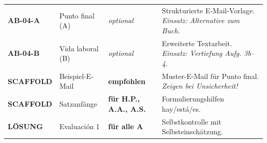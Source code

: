 \documentclass[11pt, a4paper]{article}
\begin{document}
\begin{tcolorbox}[
    colback=hellgrau,
    colframe=phase,
    title={\footnotesize\bfseries Arbeitsblätter \& Scaffolds},
    fonttitle=\bfseries,
    boxrule=0.5pt,
    top=2pt, bottom=2pt, left=4pt, right=4pt
]
\footnotesize
\begin{tabularx}{\textwidth}{@{}lp{3cm}lX@{}}
\textbf{AB-04-A} & Punto final (A) & \textit{optional} & Strukturierte E-Mail-Vorlage. \textit{Einsatz: Alternative zum Buch.} \\[0.2em]
\textbf{AB-04-B} & Vida laboral (B) & \textit{optional} & Erweiterte Textarbeit. \textit{Einsatz: Vertiefung Aufg. 3b--4.} \\[0.2em]
\hline
\textbf{SCAFFOLD} & Beispiel-E-Mail & \textbf{empfohlen} & Muster-E-Mail für Punto final. \textit{Zeigen bei Unsicherheit!} \\[0.2em]
\textbf{SCAFFOLD} & Satzanfänge & \textbf{für H.P., A.A., A.S.} & Formulierungshilfen hay/está/es. \\[0.2em]
\textbf{LÖSUNG} & Evaluación 1 & \textbf{für alle A} & Selbstkontrolle mit Selbsteinschätzung. \\
\end{tabularx}
\end{tcolorbox}

\vspace{0.2cm}

\end{document}
